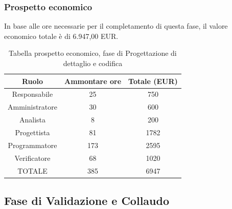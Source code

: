 \subsubsection{Prospetto economico}
In base alle ore necessarie per il completamento di questa fase, il valore economico totale è di 6.947,00 EUR.
\begin{table}[h]
\caption{Tabella prospetto economico, fase di Progettazione di dettaglio e codifica}  
\begin{center}
\begin{tabular}{ |c|c|c|  }
 \hline
 Ruolo 		& Ammontare ore 	& Totale (EUR)\\
 	\hline
 \hline
 	Responsabile	& 25 		& 750\\
	Amministratore	& 30		& 600\\
	Analista		& 8 	& 200\\
	Progettista		& 81		& 1782\\
	Programmatore	& 173		&2595 \\
	Verificatore	& 68 	& 1020\\
 \hline\hline
 TOTALE		& 385		& 6947\\
  \hline
\end{tabular}
\end{center}
\end{table}
\newpage
\subsection{Fase di Validazione e Collaudo}
